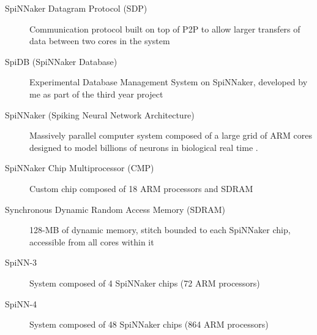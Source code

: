 \begin{description}
  \item[SpiNNaker Datagram Protocol (SDP)] Communication protocol built on top of P2P to allow larger transfers of data between two cores in the system  
    
  \item[SpiDB (SpiNNaker Database)] Experimental Database Management System on SpiNNaker, developed by me as part of the third year project
  
  \item[SpiNNaker (Spiking Neural Network Architecture)] Massively parallel computer system composed of a large grid of ARM cores designed to model billions of neurons in biological real time \cite{painkras}.
  
  \item[SpiNNaker Chip Multiprocessor (CMP)] Custom chip composed of 18 ARM processors and SDRAM  
  
  \item[Synchronous Dynamic Random Access Memory (SDRAM)] 128-MB of dynamic memory, stitch bounded to each SpiNNaker chip, accessible from all cores within it
  
  \item[SpiNN-3] System composed of 4 SpiNNaker chips (72 ARM processors)
  \item[SpiNN-4] System composed of 48 SpiNNaker chips (864 ARM processors)  

\end{description}